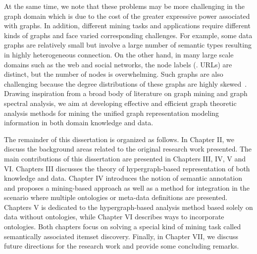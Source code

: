 \begin{enumerate}
    At the same time, we note that these problems may be more challenging in the graph domain which is due to the cost of the greater expressive power associated with graphs. In addition, different mining tasks and applications require different kinds of graphs and face varied corresponding challenges. For example, some data graphs are relatively small but involve a large number of semantic types resulting in highly heterogeneous connection. On the other hand, in many large scale domains such as the web and social networks, the node labels (\eg. URLs) are distinct, but the number of nodes is overwhelming. Such graphs are also challenging because the degree distributions of these graphs are highly skewed~\cite{Faloutsos1999}. Drawing inspiration from a broad body of literature on graph mining and graph spectral analysis, we aim at developing effective and efficient graph theoretic analysis methods for mining the unified graph representation modeling information in both domain knowledge and data.

\end{enumerate}

The remainder of this dissertation is organized as follows. In Chapter II, we discuss the background areas related to the original research work presented. The main contributions of this dissertation are presented in Chapters III, IV, V and VI. Chapters III discusses the theory of hypergraph-based representation of both knowledge and data. Chapter IV introduces the notion of semantic annotation and proposes a mining-based approach as well as a method for integration in the scenario where multiple ontologies or meta-data definitions are presented. Chapters V is dedicated to the hypergraph-based analysis method based solely on data without ontologies, while Chapter VI describes ways to incorporate ontologies. Both chapters focus on solving a special kind of mining task called semantically associated itemset discovery. Finally, in Chapter VII, we discuss future directions for the research work and provide some concluding remarks.






